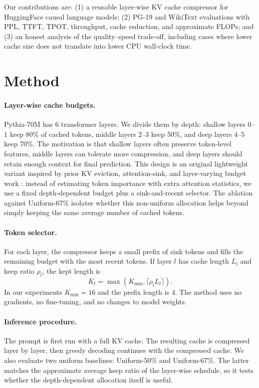 \documentclass{article}
\begin{document}
Our contributions are: (1) a reusable layer-wise KV cache compressor for
HuggingFace causal language models; (2) PG-19 and WikiText evaluations with PPL,
TTFT, TPOT, throughput, cache reduction, and approximate FLOPs; and (3) an
honest analysis of the quality--speed trade-off, including cases where lower
cache size does not translate into lower CPU wall-clock time.

\section{Method}

\paragraph{Layer-wise cache budgets.}
Pythia-70M has 6 transformer layers.  We divide them by depth:
shallow layers $0$--$1$ keep 80\% of cached tokens, middle layers $2$--$3$ keep
50\%, and deep layers $4$--$5$ keep 70\%.  The motivation is that shallow layers
often preserve token-level features, middle layers can tolerate more
compression, and deep layers should retain enough context for final prediction.
This design is an original lightweight variant inspired by prior KV eviction,
attention-sink, and layer-varying budget work
\citep{zhang2023h2o,li2024snapkv,xiao2024attention,cai2024pyramidkv}: instead
of estimating token importance with extra attention statistics, we use a fixed
depth-dependent budget plus a sink-and-recent selector.  The ablation against
Uniform-67\% isolates whether this non-uniform allocation helps beyond simply
keeping the same average number of cached tokens.

\paragraph{Token selector.}
For each layer, the compressor keeps a small prefix of sink tokens and fills the
remaining budget with the most recent tokens.  If layer $l$ has cache length
$L_l$ and keep ratio $\rho_l$, the kept length is
\[
K_l = \max(K_{\min}, \lceil \rho_l L_l \rceil).
\]
In our experiments $K_{\min}=16$ and the prefix length is 4.  The method uses no
gradients, no fine-tuning, and no changes to model weights.

\paragraph{Inference procedure.}
The prompt is first run with a full KV cache.  The resulting cache is compressed
layer by layer, then greedy decoding continues with the compressed cache.  We
also evaluate two uniform baselines: Uniform-50\% and Uniform-67\%.  The latter
matches the approximate average keep ratio of the layer-wise schedule, so it
tests whether the depth-dependent allocation itself is useful.
\end{document}
